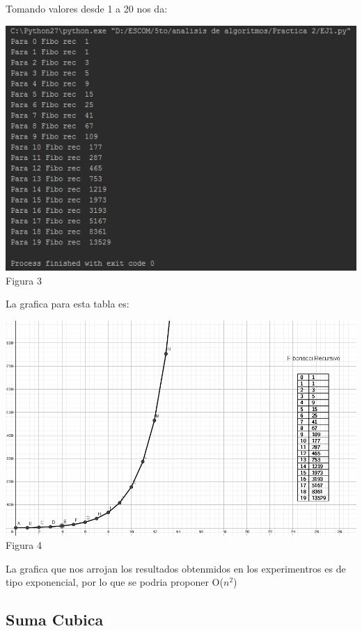 \documentclass[spanish]{article}
\begin{document}
	Tomando valores desde 1 a 20 nos da:
	\begin{center}
				\includegraphics{./imagenes/fiborecu1.png}\\
		Figura 3\\
	\end{center}
	\newpage
	La grafica para esta tabla es:\\
	\begin{center}
		\includegraphics{./imagenes/fiborecu2.png}\\
		Figura 4\\
	\end{center}
	La grafica que nos arrojan los resultados obtenmidos en los experimentros es de tipo exponencial, por lo que se podria proponer O($n^{2}$)
	\subsection{Suma Cubica}
\end{document}
